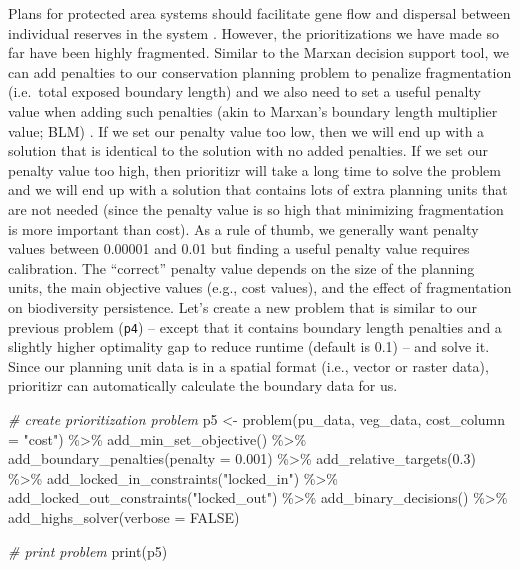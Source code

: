 \documentclass[
  12pt,
]{book}
\newenvironment{Shaded}{\begin{snugshade}}{\end{snugshade}}
\newcommand{\AttributeTok}[1]{\textcolor[rgb]{0.77,0.63,0.00}{#1}}
\newcommand{\CommentTok}[1]{\textcolor[rgb]{0.56,0.35,0.01}{\textit{#1}}}
\newcommand{\ConstantTok}[1]{\textcolor[rgb]{0.00,0.00,0.00}{#1}}
\newcommand{\FloatTok}[1]{\textcolor[rgb]{0.00,0.00,0.81}{#1}}
\newcommand{\FunctionTok}[1]{\textcolor[rgb]{0.00,0.00,0.00}{#1}}
\newcommand{\NormalTok}[1]{#1}
\newcommand{\OtherTok}[1]{\textcolor[rgb]{0.56,0.35,0.01}{#1}}
\newcommand{\SpecialCharTok}[1]{\textcolor[rgb]{0.00,0.00,0.00}{#1}}
\newcommand{\StringTok}[1]{\textcolor[rgb]{0.31,0.60,0.02}{#1}}
\begin{document}
Plans for protected area systems should facilitate gene flow and dispersal between individual reserves in the system \citep{r11, r12}. However, the prioritizations we have made so far have been highly fragmented. Similar to the Marxan decision support tool, we can add penalties to our conservation planning problem to penalize fragmentation (i.e.~total exposed boundary length) and we also need to set a useful penalty value when adding such penalties (akin to Marxan's boundary length multiplier value; BLM) \citep{r16}. If we set our penalty value too low, then we will end up with a solution that is identical to the solution with no added penalties. If we set our penalty value too high, then prioritizr will take a long time to solve the problem and we will end up with a solution that contains lots of extra planning units that are not needed (since the penalty value is so high that minimizing fragmentation is more important than cost). As a rule of thumb, we generally want penalty values between 0.00001 and 0.01 but finding a useful penalty value requires calibration. The ``correct'' penalty value depends on the size of the planning units, the main objective values (e.g., cost values), and the effect of fragmentation on biodiversity persistence. Let's create a new problem that is similar to our previous problem (\texttt{p4}) -- except that it contains boundary length penalties and a slightly higher optimality gap to reduce runtime (default is 0.1) -- and solve it. Since our planning unit data is in a spatial format (i.e., vector or raster data), prioritizr can automatically calculate the boundary data for us.

\begin{Shaded}
\begin{Highlighting}[]
\CommentTok{\# create prioritization problem}
\NormalTok{p5 }\OtherTok{\textless{}{-}}
  \FunctionTok{problem}\NormalTok{(pu\_data, veg\_data, }\AttributeTok{cost\_column =} \StringTok{"cost"}\NormalTok{) }\SpecialCharTok{\%\textgreater{}\%}
  \FunctionTok{add\_min\_set\_objective}\NormalTok{() }\SpecialCharTok{\%\textgreater{}\%}
  \FunctionTok{add\_boundary\_penalties}\NormalTok{(}\AttributeTok{penalty =} \FloatTok{0.001}\NormalTok{) }\SpecialCharTok{\%\textgreater{}\%}
  \FunctionTok{add\_relative\_targets}\NormalTok{(}\FloatTok{0.3}\NormalTok{) }\SpecialCharTok{\%\textgreater{}\%}
  \FunctionTok{add\_locked\_in\_constraints}\NormalTok{(}\StringTok{"locked\_in"}\NormalTok{) }\SpecialCharTok{\%\textgreater{}\%}
  \FunctionTok{add\_locked\_out\_constraints}\NormalTok{(}\StringTok{"locked\_out"}\NormalTok{) }\SpecialCharTok{\%\textgreater{}\%}
  \FunctionTok{add\_binary\_decisions}\NormalTok{() }\SpecialCharTok{\%\textgreater{}\%}
  \FunctionTok{add\_highs\_solver}\NormalTok{(}\AttributeTok{verbose =} \ConstantTok{FALSE}\NormalTok{)}

\CommentTok{\# print problem}
\FunctionTok{print}\NormalTok{(p5)}
\end{Highlighting}
\end{Shaded}
\end{document}
